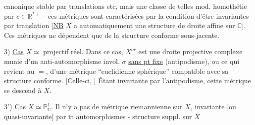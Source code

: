 canonique stable par translations etc, mais une classe de telles mod. homothétie par $c\in\mathbb R^{*+}$ - ces métriques sont caractérisées par la condition d'être invariantes par translation [\uline{NB} $X$ a automatiquement une structure de droite affine sur $\mathbb C$]. Ces métriques  ne dépendent que de la structure conforme sous-jacente.

3) \uline{Cas}  $X\simeq$  projectif réel. Dans ce   cas, $X^{or}$ est une droite projective complexe munie d'un anti-automorphisme invol. $\sigma$ \uline{sans pt fixe} (antipodisme), ou ce qui revient au $=$, d'une métrique ``euclidienne sphérique'' compatible avec sa structure conforme. [Celle-ci,  ] Étant invariante par l'antipodisme, cette métrique se descend à $X$.

$3'$) Cas $X\simeq\mathbb P^1_{\mathbb C}$. Il n'y a pas de métrique riemannienne sur $X$, invariante [ou quasi-invariante] par tt automorphismes -  structure suppl. sur $X$
